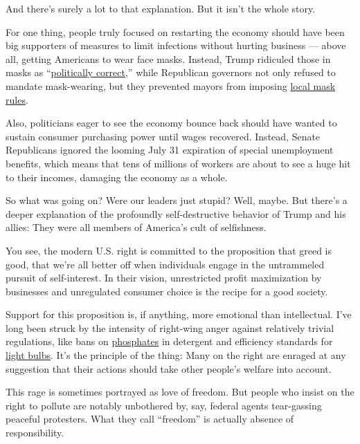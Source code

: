 And there's surely a lot to that explanation. But it isn't the whole
story.

For one thing, people truly focused on restarting the economy should
have been big supporters of measures to limit infections without hurting
business --- above all, getting Americans to wear face masks. Instead,
Trump ridiculed those in masks as
``\href{https://www.cbsnews.com/video/trump-mocks-those-wearing-face-masks-calling-it-politically-correct/}{politically
correct},'' while Republican governors not only refused to mandate
mask-wearing, but they prevented mayors from imposing
\href{https://www.cbsnews.com/news/georgia-governor-brian-kemp-bans-city-face-mask-orders-coronavirus-pandemic/}{local
mask rules}.

Also, politicians eager to see the economy bounce back should have
wanted to sustain consumer purchasing power until wages recovered.
Instead, Senate Republicans ignored the looming July 31 expiration of
special unemployment benefits, which means that tens of millions of
workers are about to see a huge hit to their incomes, damaging the
economy as a whole.

So what was going on? Were our leaders just stupid? Well, maybe. But
there's a deeper explanation of the profoundly self-destructive behavior
of Trump and his allies: They were all members of America's cult of
selfishness.

You see, the modern U.S. right is committed to the proposition that
greed is good, that we're all better off when individuals engage in the
untrammeled pursuit of self-interest. In their vision, unrestricted
profit maximization by businesses and unregulated consumer choice is the
recipe for a good society.

Support for this proposition is, if anything, more emotional than
intellectual. I've long been struck by the intensity of right-wing anger
against relatively trivial regulations, like bans on
\href{https://krugman.blogs.nytimes.com/2014/08/05/phosphate-memories/}{phosphates}
in detergent and efficiency standards for
\href{https://www.desmogblog.com/light-bulb-madness-new-case-study-right-wing-misinformation}{light
bulbs}. It's the principle of the thing: Many on the right are enraged
at any suggestion that their actions should take other people's welfare
into account.

This rage is sometimes portrayed as love of freedom. But people who
insist on the right to pollute are notably unbothered by, say, federal
agents tear-gassing peaceful protesters. What they call ``freedom'' is
actually absence of responsibility.

